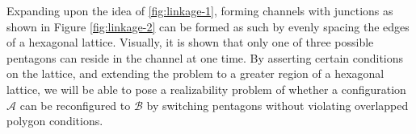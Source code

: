 Expanding upon the idea of \ref{fig:linkage-1}, forming channels with junctions as shown in Figure 
\ref{fig:linkage-2} can be formed as such by evenly spacing the edges of a hexagonal lattice.  
Visually, it is shown that only one of three possible pentagons can reside in the channel at one 
time.  By asserting certain conditions on the lattice, and extending the problem to a greater 
region 
of a hexagonal lattice, we will be able to pose a realizability problem of whether a configuration 
$\mathcal{A}$ can be reconfigured to $\mathcal{B}$ by switching pentagons without violating 
overlapped polygon conditions.

